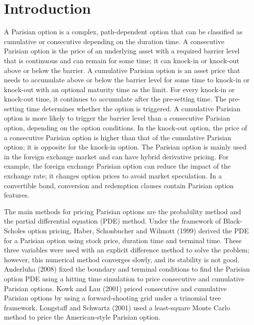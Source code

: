 \documentclass[preprint,12pt]{elsarticle}
\begin{document}


\section{Introduction}
A Parisian option is a complex, path-dependent option that can be classified as cumulative or consecutive depending on the duration time. A consecutive Parisian option is the price of an underlying asset with a required barrier level that is continuous and can remain for some time; it can knock-in or knock-out above or below the barrier. A cumulative Parisian option is an asset price that needs to accumulate above or below the barrier level for some time to knock-in or knock-out with an optional maturity time as the limit. For every knock-in or knock-out time, it continues to accumulate after the pre-setting time. The pre-setting time determines whether the option is triggered. A cumulative Parisian option is more likely to trigger the barrier level than a consecutive Parisian option, depending on the option conditions. In the knock-out option, the price of a consecutive Parisian option is higher than that of the cumulative Parisian option; it is opposite for the knock-in option. The Parisian option is mainly used in the foreign exchange market and can have hybrid derivative pricing. For example, the foreign exchange Parisian option can reduce the impact of the exchange rate; it changes option prices to avoid market speculation. In a convertible bond, conversion and redemption clauses contain Parisian option features.

The main methods for pricing Parisian options are the probability method and the partial differential equation (PDE) method. Under the framework of Black-Scholes option pricing, Haber, Schonbucher and Wilmott (1999) derived the PDE for a Parisian option using stock price, duration time and terminal time. These three variables were used with an explicit difference method to solve the problem; however, this numerical method converges slowly, and its stability is not good. Anderluha (2008) fixed the boundary and terminal conditions to find the Parisian option PDE using a hitting time simulation to price consecutive and cumulative Parisian options. Kowk and Lau (2001) priced consecutive and cumulative Parisian options by using a forward-shooting grid under a trinomial tree framework. Longstaff and Schwartz (2001) used a least-square Monte Carlo method to price the American-style Parisian option.\\
\end{document}
